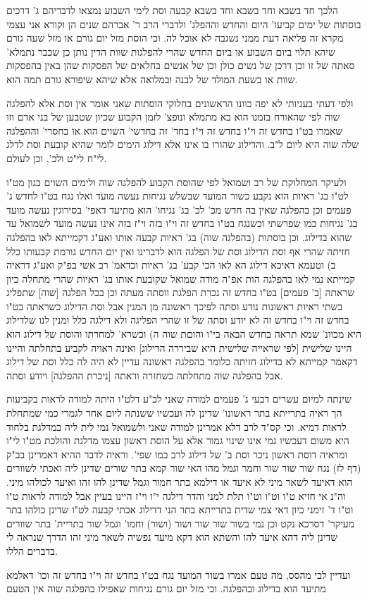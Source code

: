 \documentclass[12pt, openany]{book}
\begin{document}
הלכך חד בשבא וחד בשבא וחד בשבא קבעה וסת לימי השבוע נמצאו לדבריהם ג' דרכים בוסתות של ימים קביעו' היום והחדש וההפלג' ולדברי הרב ר' אברהם שנים הן וקורא אני עצמי מקרא זה פליאה דעת ממני נשגבה לא אוכל לה. וכי הוסת מזל יום גורם או מזל שעה גורם שיהא תלוי ביום השבוע או ביום החדש שהרי להפלגות שוות הדין נותן כן שכבר נתמלא' סאתה של זו וכן דרכן של נשים כולן וכן של אנשים בחלאים של הפסקות שהן באין בהפסקות שוות או בשעת המולד של לבנה ובמלואה אלא שיהא שיפורא גורם תמה הוא.\par ולפי דעתי בעניותי לא יפה כוונו הראשונים בחלוקי הוסתות שאני אומר אין וסת אלא להפלגה שוה לפי שהאורח בזמנו הוא בא מתמלא ונופצ' לזמן הקבוע שכיון שטבען של בני אדם וזו שאמרו בט"ו בחדש זה וי"ו בחדש זה וי"ז בחד' זה בחדשי' השוים הוא או בחסרי' וההפלגה שלה שוה היא ליום ל"ב. והדילוג שהורו בו אינו אלא דילוג הימים לומר שהיא קובעת וסת לדלג לי"ח לי"ט ולכ', וכן לעולם.\par  ולעיקר המחלוקת של רב ושמואל לפי שהוסת הקבוע להפלגה שוה ולימים השוים כגון מט"ו לט"ו בג' ראיות הוא נקבע כשור המועד שבשלש נגיחות נעשה מועד ואלו נגח בט"ו לחדש ג' פעמים וכן בהפלגה שאין בה חדש מכ' לכ' בג' נגיחו' הוא מתיעד דאפי' בסירוגין נעשה מועד בג' נגיחות כמו שפרשתי וכשנגח בט"ו בחדש זה וי"ו בזה וי"ז בזה אינו נעשה מועד לשמואל עד שהוא בדילוג. וכן בוסתות (בהפלגה שוה) בג' ראיות קבעה אותו ואע"ג דקמייתא לאו בהפלגה חזיתה שהרי אף וסת הדילוג וסת של הפלגה הוא לדברינו ואין יום החדש גורמת קבעותו כלל ב) וטעמא דאיכא דילוג הא לאו הכי קבע' בג' ראיות וכדאמ' רב אשי בפ"ק ואע"ג דראיה קמייתא נמי לאו בהפלגה הות אפ"ה מודה שמואל שקובעת אותו בג' ראיות שהרי מתחלה כיון שראתה [ב' פעמים] בט"ו בחדש זה נכרת הפלגת ווסתה מעתה וכן בכל הפלגה [שוה] שתפליג בשתי ראיות ראשונות נודע וסתה לפיכך ראשונה מן המנין אבל וסת הדילוג כשראתה בט"ו בחדש זה וי"ו בחדש זה לא יודע וסתה של זו שהרי הפליגה ולא דילגה כלל ומנין לנו שלדילוג היא מכוונ' שמא תראה בחדש הבאה בי"ו והוםת שוה ה) וכשרא' למחרתו והוסת של דילוג הוא היינו שלישית {\small [לפי שראייה שלישית היא שביררה הדילוג]}  ואינה ראויה לקביע בתחלתה והיינו דקאמר קמייתא לא בדילוג חזיתה כלומר בהפלגה ראשונה עדיין לא היה לה כלל וסת של דילוג אבל בהפלגה שוה מתחלתה כשחזרה וראתה [ניכרת ההפלגה] ויודע וסתה.\par [והא דאמרינן] שינתה למיום עשרים דבעי ג' פעמים למודה שאני לכ"ע דלט"ו היתה למודה לראות בקביעות הך ראיה בתרייתא בתר ראשונו' שדינן לה ועכשיו ששנתה ליום אחר לגמרי כמי שמתחלת לראות דמיא. וכי קס"ד לרב דלא אמרינן למודה שאני ולשמואל נמי לית ליה במדלגת בלחוד היא משום דעכשיו גמי אינו שינוי גמור אלא על הוסת ראשון עצמו מדלגת והולכת מט"ו לי"ו ומראיה דוסת ראשון ניכר וסת ב' של דילוג לרב כמו שפי'. וראיה לדבר ההיא דאמרינן בב"ק (דף לז) נגח שור שור שור וחמר וגמל מהו האי שור קמא בתר שורים שדינן ליה ואכתי לשוורים הוא דאיעד לשאר מיני לא איעד או דילמא בתר חמור וגמל שדינן להו זהו ואיעד לכולהו מיני. וה"נ אי חזיא ט"ו וט"ו וט"ו תלת למני והדר דילגה י"ו וי"ז היינו בעיין אבל למודה לראות ט"ו וט"ו ד' זימני כיון דאי צמי שדית בתרייתא בתר הני דדילוג אכתי קבעה לט"ו שדינן כולהו בתר מעיקר' דסרכא נקט וכן נמי בשור שור שור ושור (ושור) וחמו' וגמל שור בתריית' בתר שוורים שדינן ליה דהא איעד להו והשתא הוא דקא מיעד נפשיה לשאר מיני זהו הדרך שנראה לי בדברים הללו.\par  ועדיין לבי מהסס, מה טעם אמרו בשור המועד נגח בט"ו בחדש זה וי"ו בחדש זה וכו' דאלמא מתיעד הוא בדילוג ובהפלגה. וכי מזל יום גורם נגיחות שאפילו בהפלגה שוה אין הטעם 
\end{document}
